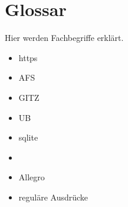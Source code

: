 
\chapter{Glossar}
Hier werden Fachbegriffe erklärt.
\begin{itemize}
  \item https
  \item AFS
  \item GITZ
  \item UB
  \item sqlite
  \item \BibTeX
  \item Allegro
  \item reguläre Ausdrücke
\end{itemize}

